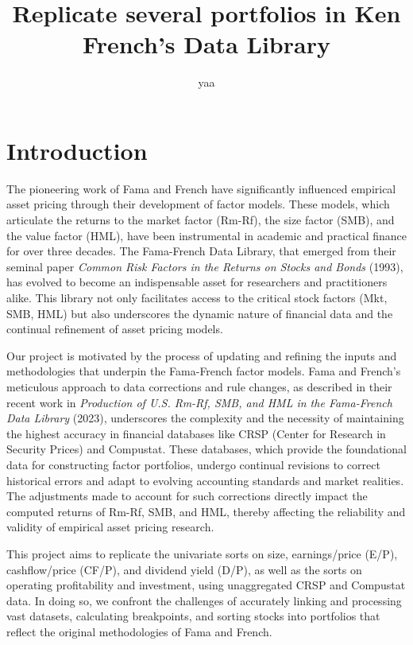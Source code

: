 \documentclass{article}
\title{Replicate several portfolios in Ken French’s Data Library}
\author{yaa}
\date{}
\begin{document}
\maketitle

\section*{Introduction}

The pioneering work of Fama and French have significantly influenced empirical asset pricing through their development of factor models. These models, which articulate the returns to the market factor (Rm-Rf), the size factor (SMB), and the value factor (HML), have been instrumental in academic and practical finance for over three decades. The Fama-French Data Library, that emerged from their seminal paper \textit{Common Risk Factors in the Returns on Stocks and Bonds} (1993), has evolved to become an indispensable asset for researchers and practitioners alike. This library not only facilitates access to the critical stock factors (Mkt, SMB, HML) but also underscores the dynamic nature of financial data and the continual refinement of asset pricing models.

Our project is motivated by the process of updating and refining the inputs and methodologies that underpin the Fama-French factor models. Fama and French's meticulous approach to data corrections and rule changes, as described in their recent work in \textit{Production of U.S. Rm-Rf, SMB, and HML in the Fama-French Data Library} (2023), underscores the complexity and the necessity of maintaining the highest accuracy in financial databases like CRSP (Center for Research in Security Prices) and Compustat. These databases, which provide the foundational data for constructing factor portfolios, undergo continual revisions to correct historical errors and adapt to evolving accounting standards and market realities. The adjustments made to account for such corrections directly impact the computed returns of Rm-Rf, SMB, and HML, thereby affecting the reliability and validity of empirical asset pricing research.

This project aims to replicate the univariate sorts on size, earnings/price (E/P), cashflow/price (CF/P), and dividend yield (D/P), as well as the sorts on operating profitability and investment, using unaggregated CRSP and Compustat data. In doing so, we confront the challenges of accurately linking and processing vast datasets, calculating breakpoints, and sorting stocks into portfolios that reflect the original methodologies of Fama and French. 
\end{document}
